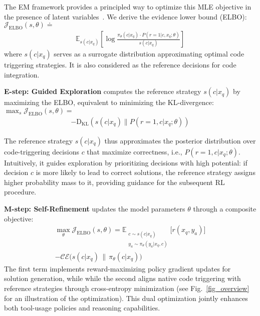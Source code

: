 The EM framework provides a principled way to optimize this MLE objective in the presence of latent variables~\cite{prml}. We derive the evidence lower bound (ELBO): \( \mathcal{J}_{\mathrm{ELBO}}(s, \theta) \doteq \)
\begin{align}
    \mathbb{E}_{s(c | x_q)}\left[\log \frac{\pi_\theta(c | x_q) \cdot P(r=1 | c, x_q; \theta)}{s(c | x_q)}\right] 
     \label{eq_elbo}
\end{align}
where \(s(c | x_q)\) serves as a surrogate distribution approximating optimal code triggering strategies. It is also considered as the reference decisions for code integration. 

\noindent\textbf{E-step: Guided Exploration}  computes the reference strategy \(s(c | x_q)\) by maximizing the ELBO, equivalent to minimizing the KL-divergence: \( \max_s \mathcal{J}_{\mathrm{ELBO}}(s, \theta) = \)
\begin{align}
     - \mathrm{D_{KL}}\left(s(c | x_q) \| P(r=1, c | x_q; \theta)\right) \label{eq_estep}
\end{align}

The reference strategy \(s(c | x_q)\) thus approximates the posterior distribution over code-triggering decisions \(c\) that maximize correctness, i.e., \(P(r=1, c | x_q; \theta)\).  Intuitively, it guides exploration by prioritizing decisions with high potential: if decision \(c\) is more likely to lead to correct solutions, the reference strategy assigns higher probability mass to it, providing guidance for the subsequent RL procedure.

\noindent\textbf{M-step: Self-Refinement } updates the model parameters \(\theta\) through a composite objective:
\begin{multline}
\max_\theta \mathcal{J}_{\mathrm{ELBO}}(s, \theta) =\mathbb{E}_{\substack{c \sim s(c|x_q) \\ y_a \sim \pi_\theta(y_a|x_q, c)}} \Big[ r(x_q, y_a) \Big] \\- \mathcal{CE}\Big(s(c|x_q) \,\|\, \pi_\theta(c|x_q)\Big)\label{eq_mstep}
\end{multline}
The first term implements reward-maximizing policy gradient updates for solution generation, while while the second aligns native code triggering with reference strategies through cross-entropy minimization (see Fig.~\ref{fig_overview} for an illustration of the optimization). This dual optimization jointly enhances both tool-usage policies and reasoning capabilities.



